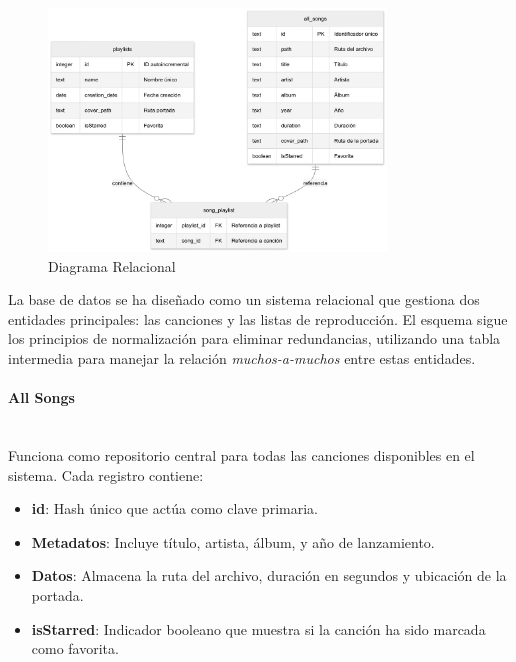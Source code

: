 \documentclass[11pt, a4paper]{article}
\begin{document}
            \begin{figure}[H]
              \centering
              \includegraphics[width=0.8\textwidth]{media/DiagramaRelacional.png}
              \caption{Diagrama Relacional}
              \label{fig:relacional}
            \end{figure}

            La base de datos se ha diseñado como un sistema relacional que gestiona dos entidades principales: las canciones y las listas de reproducción. El esquema sigue los principios de normalización para eliminar redundancias, utilizando una tabla intermedia para manejar la relación \textit{muchos-a-muchos} entre estas entidades.

              \paragraph{All Songs}
              ‎ \\

              Funciona como repositorio central para todas las canciones disponibles en el sistema. Cada registro contiene:

              \begin{itemize}
                \item \textbf{id}: Hash único que actúa como clave primaria.
                \item \textbf{Metadatos}: Incluye título, artista, álbum, y año de lanzamiento.
                \item \textbf{Datos}:  Almacena la ruta del archivo, duración en segundos y ubicación de la portada.
                \item \textbf{isStarred}: Indicador booleano que muestra si la canción ha sido marcada como favorita.
              \end{itemize}
\end{document}

